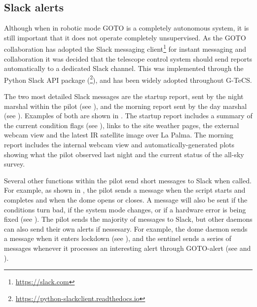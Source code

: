 \subsection{Slack alerts}
\label{sec:slack}
\begin{colsection}

Although when in robotic mode GOTO is a completely autonomous system, it is still important that it does not operate completely unsupervised. As the GOTO collaboration has adopted the Slack messaging client\footnote{\url{https://slack.com}} for instant messaging and collaboration it was decided that the telescope control system should send reports automatically to a dedicated Slack channel. This was implemented through the Python Slack API package (\footnote{\url{https://python-slackclient.readthedocs.io}}), and has been widely adopted throughout G-TeCS.\@

The two most detailed Slack messages are the startup report, sent by the night marshal within the pilot (see ), and the morning report sent by the day marshal (see ). Examples of both are shown in . The startup report includes a summary of the current condition flags (see ), links to the site weather pages, the external webcam view and the latest IR satellite image over La Palma. The morning report includes the internal webcam view and automatically-generated plots showing what the pilot observed last night and the current status of the all-sky survey.

Several other functions within the pilot send short messages to Slack when called. For example, as shown in , the pilot sends a message when the script starts and completes and when the dome opens or closes. A message will also be sent if the conditions turn bad, if the system mode changes, or if a hardware error is being fixed (see ). The pilot sends the majority of messages to Slack, but other daemons can also send their own alerts if nessesary. For example, the dome daemon sends a message when it enters lockdown (see ), and the sentinel sends a series of messages whenever it processes an interesting alert through GOTO-alert (see  and ).


\end{colsection}
